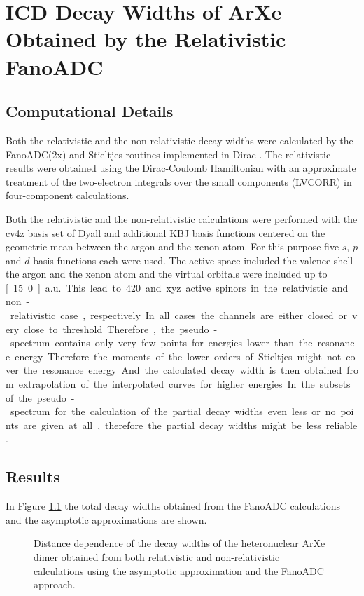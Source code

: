 \chapter{\ac{ICD} Decay Widths of ArXe Obtained by the Relativistic FanoADC}
\section{Computational Details}
Both the relativistic and the non-relativistic decay widths were calculated by
the FanoADC(2x) and Stieltjes routines implemented in Dirac \cite{DIRAC13}.
The relativistic results were obtained using the
Dirac-Coulomb Hamiltonian with an approximate treatment of the two-electron
integrals over the small components (LVCORR)
in four-component calculations.

Both the relativistic and the non-relativistic calculations were performed
with the cv4z basis set of Dyall \cite{} and additional \ac{KBJ} \cite{Kaufmann89}
basis functions centered on the geometric mean between the argon and the xenon
atom. For this purpose five $s$, $p$ and $d$ basis functions each were used.
The active space included the valence shell the argon and the xenon atom and
the virtual orbitals were included up to \unit[15.0]{a.u.}. 
This lead to 420 and xyz active spinors in the relativistic and non-relativistic
case, respectively.

In all cases the channels are either closed or very close to threshold.
Therefore, the pseudo-spectrum contains only very few points for energies
lower than the resonance energy. Therefore the moments of the lower orders of
Stieltjes might not cover the resonance energy. And the calculated decay width
is then obtained from extrapolation of the interpolated curves for higher energies.
In the subsets of the pseudo-spectrum for the
calculation of the partial decay widths even less or no points are given at all,
therefore the partial decay widths might be less reliable.


\section{Results}
In Figure \ref{figure:arxe_gamma_shift_fano} the total decay widths obtained
from the FanoADC calculations and the asymptotic approximations are shown.

\begin{figure}[]
  \centering
  
  \caption{Distance dependence of the decay widths of the heteronuclear
           ArXe dimer obtained from both relativistic and non-relativistic
           calculations using the asymptotic approximation and the FanoADC
           approach.}
  \label{figure:arxe_gamma_shift_fano}
\end{figure}

